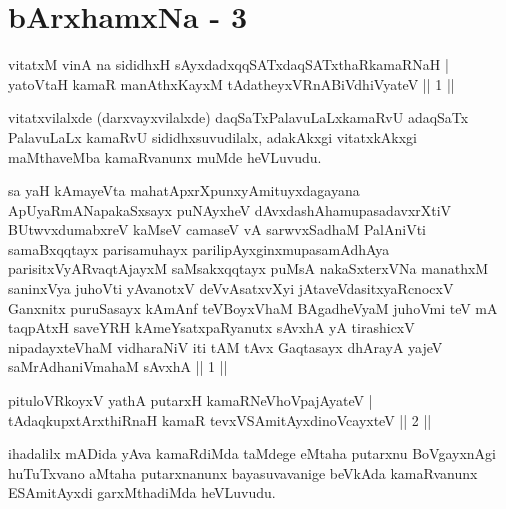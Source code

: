 \chapter{bArxhamxNa - 3}


\begin{shl}
vitatxM vinA na sididhxH sAyxdadxqqSATxdaqSATxthaRkamaRNaH | \\
yatoV\s taH kamaR manAthxKayxM tAdatheyxVRnABiVdhiVyateV \hfill|| 1 || 
\end{shl}

\begin{artha}
vitatxvilalxde (darxvayxvilalxde) daqSaTxPalavuLaLxkamaRvU adaqSaTx PalavuLaLx kamaRvU sididhxsuvudilalx, adakAkxgi vitatxkAkxgi maMthaveMba kamaRvanunx muMde heVLuvudu.
\end{artha}


\begin{kandikeshl}
sa yaH kAmayeVta mahatApxrXpunxyAmituyxdagayana ApUyaRmANapakaSxsayx puNAyxheV dAvxdashAhamupasadavxrXtiV BUtwvxdumabxreV kaMseV camaseV vA sarwvxSadhaM PalAniVti samaBxqqtayx parisamuhayx parilipAyxginxmupasamAdhAya parisitxVyARvaqtAjayxM saMsakxqqtayx puMsA nakaSxterxVNa manathxM saninxVya juhoVti yAvanotxV deVvAsatxvXyi jAtaveVdasitxyaRcnocxV Ganxnitx puruSasayx kAmAnf teVBoyxV\s haM BAgadheVyaM juhoVmi teV mA taqpAtxH saveYRH kAmeYsatxpaRyanutx sAvxhA yA tirashicxV nipadayxteV\s haM vidharaNiV iti tAM tAvx Gaqtasayx dhArayA yajeV saMrAdhaniVmahaM sAvxhA || 1 ||
\end{kandikeshl}


\begin{shl}
pituloVRkoyxV yathA putarxH kamaRNeVhoVpajAyateV | \\
tAdaqkupxtArxthiRnaH kamaR tevxVSAmitAyxdinoVcayxteV \hfill|| 2 || 
\end{shl}

\begin{artha}
ihadalilx mADida yAva kamaRdiMda taMdege eMtaha putarxnu BoVgayxnAgi huTuTxvano aMtaha putarxnanunx bayasuvavanige beVkAda kamaRvanunx ESAmitAyxdi garxMthadiMda heVLuvudu.
\end{artha}


